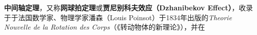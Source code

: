 

\textbf{中间轴定理}，又称\textbf{网球拍定理}或\textbf{贾尼别科夫效应（Dzhanibekov Effect）}，收录于于法国数学家、物理学家潘森（Louis Poinsot）于1834年出版的\textsl{Theorie Nouvelle de la Rotation des Corps}（《转动物体的新理论》），并在



















